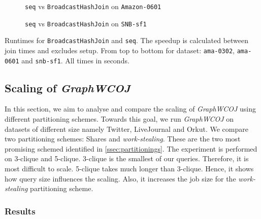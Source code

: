 \begin{figure}
    \centering
    
    \caption{\texttt{seq} vs \texttt{BroadcastHashJoin} on \texttt{Amazon-0601}}
    \label{fig:seq-bar-ama-0601}
\end{figure}

\begin{figure}
    \centering
    
    \caption{\texttt{seq} vs \texttt{BroadcastHashJoin} on \texttt{SNB-sf1}}
    \label{fig:seq-bar-snb-sf1}
\end{figure}

\begin{table}
    \centering

    
    \vspace{0.3cm}

    

    \vspace{0.3cm}
    
    \caption{Runtimes for \texttt{BroadcastHashJoin} and \texttt{seq}.
    The speedup is calculated between join times and excludes setup.
    From top to bottom for dataset: \texttt{ama-0302}, \texttt{ama-0601} and \texttt{snb-sf1}.
    All times in seconds.
    }
    \label{table:seq-vs-bhj}
\end{table}


\subsection{Scaling of \textit{Graph\textsc{WCOJ}}}

In this section, we aim to analyse and compare the scaling of \textit{Graph\textsc{WCOJ}} using different
partitioning schemes.
Towards this goal, we run \textit{Graph\textsc{WCOJ}} on datasets of different size namely Twitter,
LiveJournal and Orkut.
We compare two partitioning schemes: Shares and \textit{work-stealing}.
These are the two most promising schemed identified in \cref{ssec:partitionings}.
The experiment is performed on 3-clique and 5-clique.
3-clique is the smallest of our queries.
Therefore, it is most difficult to scale.
5-clique takes much longer than 3-clique.
Hence, it shows how query size influences the scaling.
Also, it increases the job size for the \textit{work-stealing} partitioning scheme.


\subsubsection{Results}

